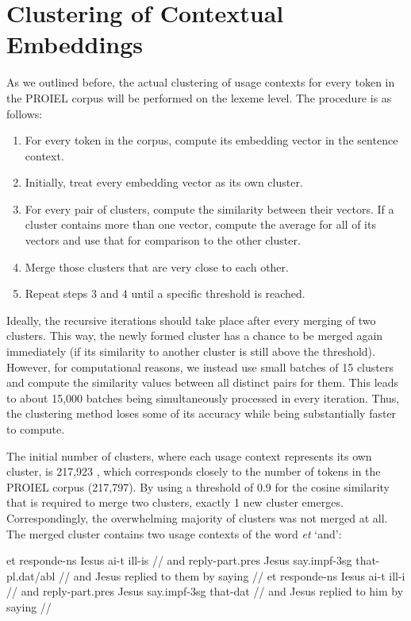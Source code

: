 \section{Clustering of Contextual Embeddings}
As we outlined before, the actual clustering of usage contexts for every token in the PROIEL corpus will be performed on the lexeme level. The procedure is as follows:
\begin{enumerate}
	\item For every token in the corpus, compute its embedding vector in the sentence context.
	\item Initially, treat every embedding vector as its own cluster.
	\item For every pair of clusters, compute the similarity between their vectors. If a cluster contains more than one vector, compute the average for all of its vectors and use that for comparison to the other cluster.
	\item Merge those clusters that are very close to each other.
	\item Repeat steps 3 and 4 until a specific threshold is reached.
\end{enumerate}

Ideally, the recursive iterations should take place after every merging of two clusters. This way, the newly formed cluster has a chance to be merged again immediately (if its similarity to another cluster is still above the threshold). However, for computational reasons, we instead use small batches of 15 clusters and compute the similarity values between all distinct pairs for them. This leads to about 15,000 batches being simultaneously processed in every iteration. Thus, the clustering method loses some of its accuracy while being substantially faster to compute.

The initial number of clusters, where each usage context represents its own cluster, is 217,923 , which corresponds closely to the number of tokens in the PROIEL corpus (217,797). 
By using a threshold of 0.9 for the cosine similarity that is required to merge two clusters, exactly 1 new cluster emerges. Correspondingly, the overwhelming majority of clusters was not merged at all. The merged cluster contains two usage contexts of the word \textit{et} `and':

\vspace{10pt}
\ex[exno=PROIEL 11203]
	\begingl
		\gla et responde-ns Iesus ai-t ill-is //
		\glb and reply-{\sc part.pres} Jesus say.{\sc impf-3sg} that-{\sc pl.dat/abl} //
		\glft and Jesus replied to them by saying //
	\endgl
\xe 
\vspace{10pt}
\ex[exno=PROIEL 16513]
	\begingl
		\gla et responde-ns Iesus ai-t ill-i //
		\glb and reply-{\sc part.pres} Jesus say.{\sc impf-3sg} that-{\sc dat} //
		\glft and Jesus replied to him by saying //
	\endgl
\xe
\vspace{10pt}

